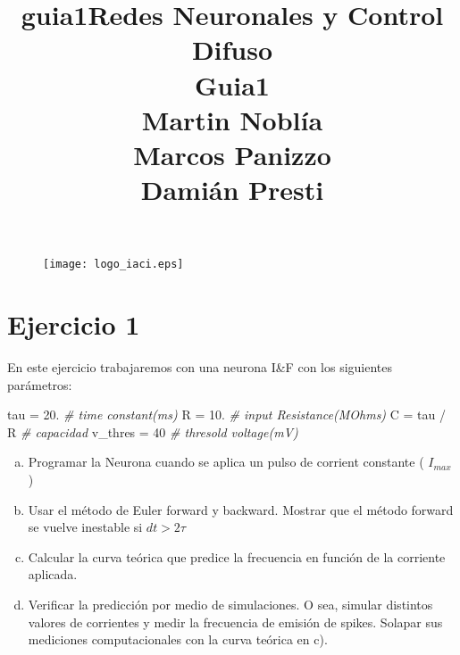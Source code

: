 \documentclass{article}
\title{guia1}
\title{\textbf{Redes Neuronales y Control Difuso} \\ \vspace{1cm} Guia1 \\Martin Noblía \\ Marcos Panizzo \\ Damián Presti}
\newenvironment{Shaded}{}{}
\newcommand{\DecValTok}[1]{\textcolor[rgb]{0.25,0.63,0.44}{{#1}}}
\newcommand{\CommentTok}[1]{\textcolor[rgb]{0.38,0.63,0.69}{\textit{{#1}}}}
\newcommand{\NormalTok}[1]{{#1}}
\begin{document}
    
    
    \maketitle
    
   \begin{figure}[h!]
   \centering
   \texttt{[image: logo\_iaci.eps]}
   \end{figure}

    
%
%
%
%
%
%
%

\section{Ejercicio 1}

    En este ejercicio trabajaremos con una neurona I\&F con los siguientes
parámetros:

\begin{Shaded}
\begin{Highlighting}[]
 \NormalTok{tau = }\DecValTok{20}\NormalTok{.  }\CommentTok{# time constant(ms)}
 \NormalTok{R = }\DecValTok{10}\NormalTok{.  }\CommentTok{# input Resistance(MOhms)}
 \NormalTok{C = tau / R  }\CommentTok{# capacidad}
 \NormalTok{v_thres = }\DecValTok{40}  \CommentTok{# thresold voltage(mV)}
\end{Highlighting}
\end{Shaded}
\begin{enumerate}[a)]
\item
  Programar la Neurona cuando se aplica un pulso de corrient constante (
  $I_{max}$ )
\item
  Usar el método de Euler forward y backward. Mostrar que el método
  forward se vuelve inestable si $dt > 2 \tau$
\item
  Calcular la curva teórica que predice la frecuencia en función de la
  corriente aplicada.
\item
  Verificar la predicción por medio de simulaciones. O sea, simular
  distintos valores de corrientes y medir la frecuencia de emisión de
  spikes. Solapar sus mediciones computacionales con la curva teórica en
  c).
\end{enumerate}
\end{document}
